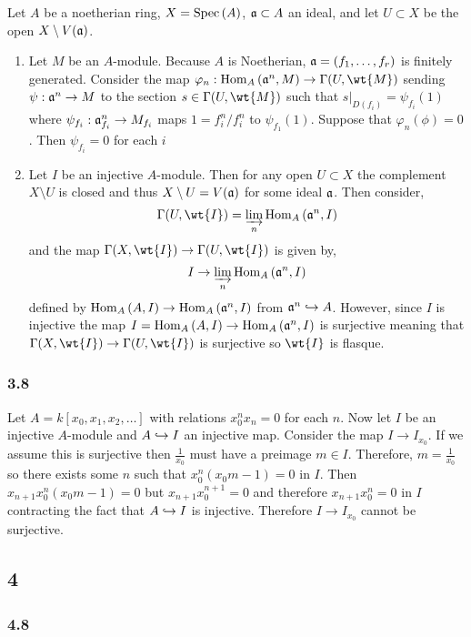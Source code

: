 \documentclass[12pt]{article}
\begin{document}
Let $A$ be a noetherian ring, $X = \mathrm{Spec}\left( A \right)$, $\mathfrak{a} \subset A$ an ideal, and let $U \subset X$ be the open $X \setminus V(\mathfrak{a})$. 
\begin{enumerate}
\item Let $M$ be an $A$-module. Because $A$ is Noetherian, $\mathfrak{a} = (f_1, \dots, f_r)$ is finitely generated. Consider the map $\varphi_n : \Hom{A}{\a^n}{M} \to \Gamma(U, \wt{M})$ sending $\psi : \mathfrak{a}^n \to M$ to the section $s \in \Gamma(U, \wt{M})$ such that $s|_{D(f_i)} = \psi_{f_i}(1)$ where $\psi_{f_i} : \mathfrak{a}^n_{f_i} \to M_{f_i}$ maps $1 = f_i^n/f_i^n$ to $\psi_{f_1}(1)$. Suppose that $\varphi_n(\phi) = 0$. Then $\psi_{f_i} = 0$ for each $i$

\item Let $I$ be an injective $A$-module. Then for any open $U \subset X$ the complement $X \setminus U$ is closed and thus $X \setminus U = V(\mathfrak{a})$ for some ideal $\mathfrak{a}$. Then consider,
\[ \Gamma(U, \wt{I}) = \varinjlim_{n} \Hom{A}{\a^n}{I} \]
and the map $\Gamma(X, \wt{I}) \to \Gamma(U, \wt{I})$ is given by,
\[ I \to \varinjlim_{n} \mathrm{Hom}_{A} \left( \mathfrak{a}^n, I \right) \]
defined by $\mathrm{Hom}_{A} \left( A, I \right) \to \mathrm{Hom}_{A} \left( \mathfrak{a}^n, I \right)$ from $\mathfrak{a}^n \hookrightarrow A$. However, since $I$ is injective the map $I = \mathrm{Hom}_{A} \left( A, I \right) \to \mathrm{Hom}_{A} \left( \mathfrak{a}^n, I \right)$ is surjective meaning that $\Gamma(X, \wt{I}) \to \Gamma(U, \wt{I})$ is surjective so $\wt{I}$ is flasque.
\end{enumerate}

\subsubsection{3.8}

Let $A = k[x_0, x_1, x_2, \dots ]$ with relations $x_0^n x_n = 0$ for each $n$. Now let $I$ be an injective $A$-module and $A \hookrightarrow I$ an injective map. Consider the map $I \to I_{x_0}$. If we assume this is surjective then $\frac{1}{x_0}$ must have a preimage $m \in I$. Therefore, $m = \frac{1}{x_0}$ so there exists some $n$ such that $x_0^n(x_0 m - 1) = 0$ in $I$. Then $x_{n+1} x_0^n(x_0 m - 1) = 0$ but $x_{n+1} x_0^{n+1} = 0$ and therefore $x_{n+1} x_0^n = 0$ in $I$ contracting the fact that $A \hookrightarrow I$ is injective. Therefore $I \to I_{x_0}$ cannot be surjective.

\subsection{4}

\subsubsection{4.8}
\end{document}
